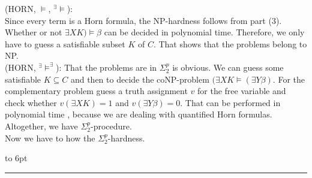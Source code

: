 \documentclass[12pt]{article}
\newcommand{\AM}{\mbox{$^\exists\!\!\models$}}
\newcommand{\AMB}{\mbox{$^\exists\!\!\models^\exists$}}
\newenvironment{proof}{\parindent=0pt{\bf Proof: }}{
   \hspace*{\fill}\hbox to 6pt{\leaders\hrule width 6pt height 6pt\hfill}\par}
\begin{document}
\begin{proof}
(HORN, $\models$, \AM):\\
Since every term is a Horn formula, the NP-hardness follows from part (3).
 Whether or not $\exists X K) \models \beta$ can be decided in polynomial time. Therefore, we only have to guess a satisfiable subset $K$ of $C$. That shows that the problems belong to NP.\\

(HORN, \AMB):  That the problems are in $\Sigma^p_2$ is obvious. We can guess some satisfiable $K \subseteq C$ and
then to decide the coNP-problem $(\exists X K \models (\exists Y \beta)$. For the complementary problem guess a
truth assignment $v$ for the free variable and check whether $v(\exists X K)=1$ and $v(\exists Y \beta)=0$.
That can be performed in polynomial time , because we are dealing with quantified Horn formulas. Altogether,
we have $\Sigma^p_2$-procedure.\\

Now we have to how the $\Sigma^p_2$-hardness.
\end{proof}
\vspace*{3mm}
\end{document}
